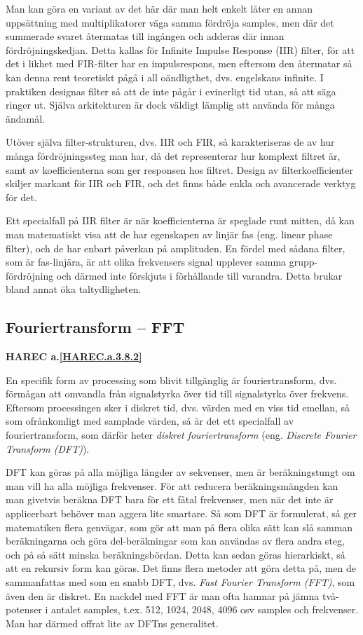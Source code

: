 Man kan göra en variant av det här där man helt enkelt låter en annan
uppsättning med multiplikatorer väga samma fördröja samples, men där det
summerade svaret återmatas till ingången och adderas där innan
fördröjningskedjan.
Detta kallas för Infinite Impulse Response (IIR) filter, för att det i likhet
med FIR-filter har en impulsrespons, men eftersom den återmatar så kan denna
rent teoretiskt pågå i all oändligthet, dvs. engelskans infinite.
I praktiken designas filter så att de inte pågår i evinerligt tid utan, så att
säga ringer ut.
Själva arkitekturen är dock väldigt lämplig att använda för många ändamål.

Utöver själva filter-strukturen, dvs. IIR och FIR, så karakteriseras de av hur
många fördröjningssteg man har, då det representerar hur komplext filtret är,
samt av koefficienterna som ger responsen hos filtret.
Design av filterkoefficienter skiljer markant för IIR och FIR, och det finns
både enkla och avancerade verktyg för det.

Ett specialfall på IIR filter är när koefficienterna är speglade runt mitten,
då kan man matematiskt visa att de har egenskapen av linjär fas (eng. linear
phase filter), och de har enbart påverkan på amplituden.
En fördel med sådana filter, som är fas-linjära, är att olika frekvensers
signal upplever samma grupp-fördröjning och därmed inte förskjuts i förhållande
till varandra.
Detta brukar bland annat öka taltydligheten.

\subsection{Fouriertransform -- FFT}
\textbf{HAREC a.\ref{HAREC.a.3.8.2}\label{myHAREC.a.3.8.2}}

En specifik form av processing som blivit tillgänglig är fouriertransform,
dvs. förmågan att omvandla från signalstyrka över tid till signalstyrka över
frekvens.
Eftersom processingen sker i diskret tid, dvs. värden med en viss tid emellan,
så som ofrånkomligt med samplade värden, så är det ett specialfall av
fouriertransform, som därför heter \emph{diskret fouriertransform}  (eng.
\emph{Discrete Fourier Transform (DFT)}).

DFT kan göras på alla möjliga längder av sekvenser, men är beräkningstungt
om man vill ha alla möjliga frekvenser.
För att reducera beräkningsmängden kan man givetvis beräkna DFT bara för ett
fåtal frekvenser, men när det inte är applicerbart behöver man aggera lite
smartare.
Så som DFT är formulerat, så ger matematiken flera genvägar, som gör att man
på flera olika sätt kan slå samman beräkningarna och göra del-beräkningar som
kan användas av flera andra steg, och på så sätt minska beräkningsbördan.
Detta kan sedan göras hierarkiskt, så att en rekursiv form kan göras.
Det finns flera metoder att göra detta på, men de sammanfattas med som en
snabb DFT, dvs. \emph{Fast Fourier Transform (FFT)}, som även den är diskret.
En nackdel med FFT är man ofta hamnar på jämna två-potenser i antalet samples,
t.ex. 512, 1024, 2048, 4096 osv samples och frekvenser.
Man har därmed offrat lite av DFTns generalitet.

